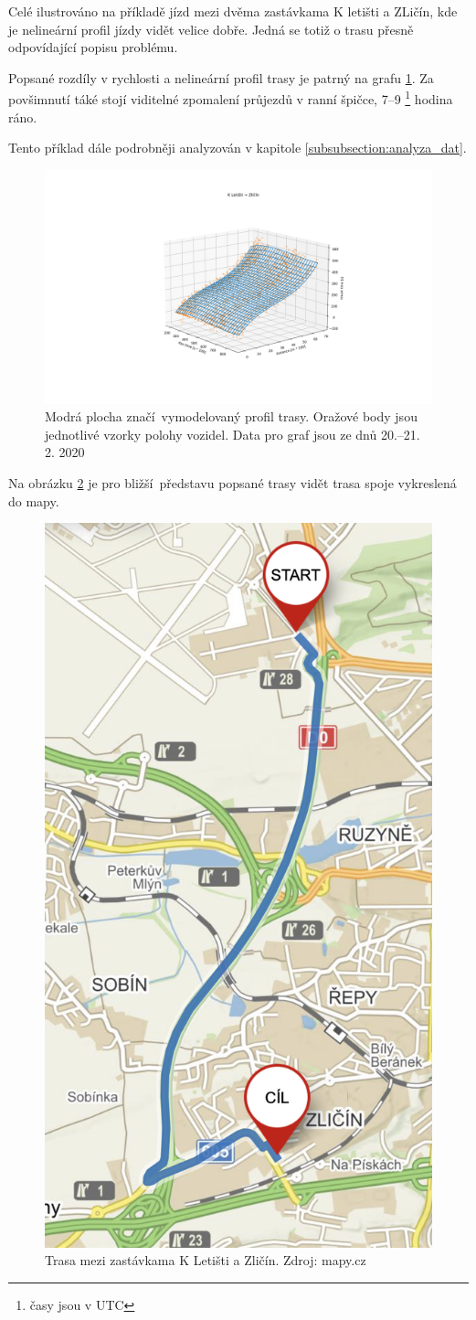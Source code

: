 Celé ilustrováno na příkladě jízd mezi dvěma zastávkama K letišti a ZLičín, kde je nelineární profil jízdy vidět velice dobře. Jedná se totiž o trasu přesně odpovídající popisu problému.

\bigbreak

Popsané rozdíly v rychlosti a nelineární profil trasy je patrný na grafu \ref{fig:k_letisti_to_zlicin_3d}. Za povšimnutí táké stojí viditelné zpomalení průjezdů v ranní špičce, 7--9 \footnote{časy jsou v UTC} hodina ráno.

\bigbreak

Tento příklad dále podrobněji analyzován v kapitole \ref{subsubsection:analyza_dat}.

\begin{figure}
  \includegraphics[width=\linewidth]{../img/k_letisti_to_zlicin_3d.png}
  \caption{Modrá plocha značí vymodelovaný profil trasy. Oražové body jsou jednotlivé vzorky polohy vozidel. Data pro graf jsou ze dnů 20.--21. 2. 2020}
  \label{fig:k_letisti_to_zlicin_3d}
\end{figure}

\bigbreak

Na obrázku \ref{fig:k_letisti_to_zlicin_map} je pro bližší představu popsané trasy vidět trasa spoje vykreslená do mapy.

\begin{figure}
	\centering
  \includegraphics[width=0.3\linewidth]{../img/k_letisti_to_zlicin_map.png}
  \caption{Trasa mezi zastávkama K Letišti a Zličín. Zdroj: mapy.cz}
  \label{fig:k_letisti_to_zlicin_map}
\end{figure}


